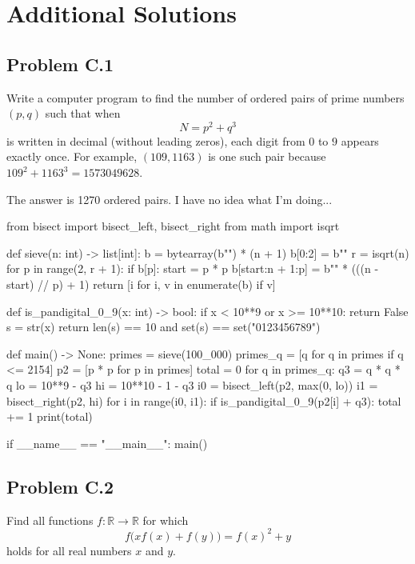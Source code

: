 \documentclass[12pt]{article}
\begin{document}
  \clearpage

  \section{\textsf{Additional Solutions}}
    \subsection{Problem C.1}
      \begin{tcolorbox}[problembox]
         Write a computer program to find the number of ordered pairs of prime numbers $(p,q)$ such that when
          \[
            N = p^2 + q^3
          \]
          is written in decimal (without leading zeros), each digit from $0$ to $9$ appears exactly once. For example, $(109,1163)$ is one
          such pair because $109^2 + 1163^3 = 1573049628$.
     \end{tcolorbox}
     The answer is 1270 ordered pairs. I have no idea what I'm doing...
     \begin{pycode}
        from bisect import bisect_left, bisect_right
        from math import isqrt

        def sieve(n: int) -> list[int]:
          b = bytearray(b"") * (n + 1)
          b[0:2] = b""
          r = isqrt(n)
          for p in range(2, r + 1):
            if b[p]:
              start = p * p
              b[start:n + 1:p] = b"" * (((n - start) // p) + 1)
          return [i for i, v in enumerate(b) if v]

        def is_pandigital_0_9(x: int) -> bool:
          if x < 10**9 or x >= 10**10:
            return False
          s = str(x)
          return len(s) == 10 and set(s) == set("0123456789")

        def main() -> None:
          primes = sieve(100_000)
          primes_q = [q for q in primes if q <= 2154]
          p2 = [p * p for p in primes]
          total = 0
          for q in primes_q:
            q3 = q * q * q
            lo = 10**9 - q3
            hi = 10**10 - 1 - q3
            i0 = bisect_left(p2, max(0, lo))
            i1 = bisect_right(p2, hi)
            for i in range(i0, i1):
              if is_pandigital_0_9(p2[i] + q3):
                total += 1
          print(total)

        if __name__ == "__main__":
          main()
     \end{pycode}

    \clearpage

    \subsection{Problem C.2}
      \begin{tcolorbox}[problembox]
         Find all functions $f:\mathbb{R}\to\mathbb{R}$ for which
          \[
            f\big(xf(x)+f(y)\big)=f(x)^2+y
          \]
          holds for all real numbers $x$ and $y$.
      \end{tcolorbox}
\end{document}

